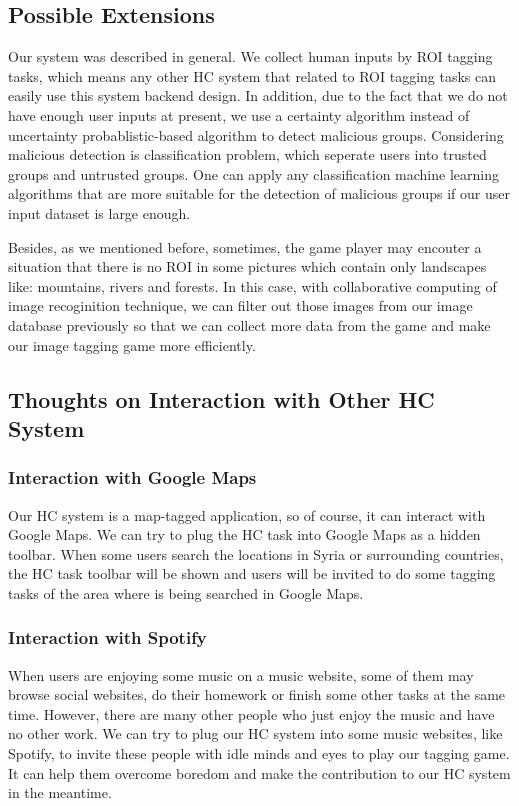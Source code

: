 \subsection{Possible Extensions}

Our system was described in general. We collect human inputs by ROI tagging tasks, 
which means any other HC system that related to ROI tagging tasks can easily use this system backend design.
In addition, due to the fact that we do not have enough user inputs at present, we use a certainty algorithm instead of 
uncertainty probablistic-based algorithm to detect malicious groups. 
Considering malicious detection is classification problem, which seperate users into trusted groups and untrusted groups. 
One can apply any classification machine learning algorithms that are more suitable for the detection of malicious groups 
if our user input dataset is large enough.

Besides, as we mentioned before, sometimes, the game player may encouter a situation that 
there is no ROI in some pictures which contain only landscapes like: mountains, rivers and forests.
In this case, with collaborative computing of image recoginition technique, we can filter out those images 
from our image database previously so that we can collect more data from the game and 
make our image tagging game more efficiently.

\subsection{Thoughts on Interaction with Other HC System}

\subsubsection{Interaction with Google Maps}
Our HC system is a map-tagged application, so of course, it can interact with Google Maps. 
We can try to plug the HC task into Google Maps as a hidden toolbar. When some users search the locations in Syria 
or surrounding countries, the HC task toolbar will be shown and users will be invited to do some tagging tasks 
of the area where is being searched in Google Maps.

\subsubsection{Interaction with Spotify}
When users are enjoying some music on a music website, some of them may browse social websites, 
do their homework or finish some other tasks at the same time. However, there are many other people 
who just enjoy the music and have no other work. We can try to plug our HC system into some music websites, 
like Spotify, to invite these people with idle minds and eyes to play our tagging game. 
It can help them overcome boredom and make the contribution to our HC system in the meantime.

